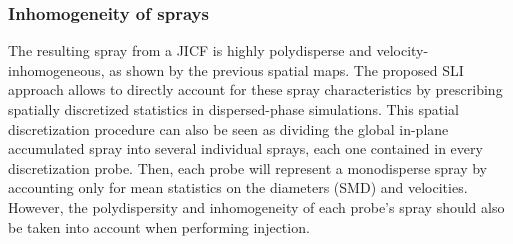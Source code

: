 \clearpage


\subsubsection*{Inhomogeneity of sprays}

The resulting spray from a JICF is highly polydisperse and velocity-inhomogeneous, as shown by the previous spatial maps. The proposed SLI approach allows to directly account for these spray characteristics by prescribing spatially discretized statistics in dispersed-phase simulations. This spatial discretization procedure can also be seen as dividing the global in-plane accumulated spray into several individual sprays, each one contained in every discretization probe. Then, each probe will represent a monodisperse spray by accounting only for mean statistics on the diameters (SMD) and velocities. However, the polydispersity and inhomogeneity of each probe's spray should also be taken into account when performing injection.


